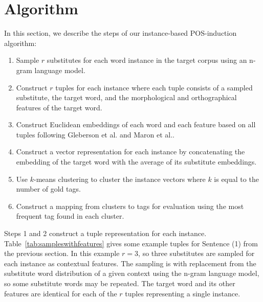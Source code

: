 \section{Algorithm}
\label{sec:algorithm}

In this section, we describe the steps of our instance-based
POS-induction algorithm:
\begin{enumerate}
  \item Sample $r$ substitutes for each word instance in the target
    corpus using an n-gram language model.
  \item Construct $r$ tuples for each instance where each tuple
    consists of a sampled substitute, the target word, and the
    morphological and orthographical features of the target word.
  \item Construct Euclidean embeddings of each word and each feature based on
    all tuples following Gleberson et al.
    and Maron et al..
  \item Construct a vector representation for each instance by
    concatenating the embedding of the target word with the average of
    its substitute embeddings.
  \item Use $k$-means clustering to cluster the instance vectors where
    $k$ is equal to the number of gold tags.
  \item Construct a mapping from clusters to tags for evaluation using
    the most frequent tag found in each cluster.
\end{enumerate}

Steps 1 and 2 construct a tuple representation for each instance.
Table~\ref{tab:sampleswithfeatures} gives some example tuples for Sentence (1)
from the previous section.  In this example $r=3$, so three substitutes are
sampled for each instance as contextual features.  The sampling is with
replacement from the substitute word distribution of a given context using the
n-gram language model, so some substitute words may be repeated.  The target
word and its other features are identical for each of the $r$ tuples
representing a single instance.

